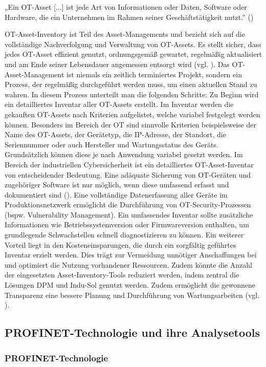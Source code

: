   „Ein OT-Asset [...] ist jede Art von Informationen oder Daten, Software oder Hardware, die ein Unternehmen im Rahmen seiner Geschäftstätigkeit nutzt.'' (\cite{IBM})

OT-Asset-Inventory ist Teil des Asset-Managements und bezieht sich auf die vollständige Nachverfolgung und Verwaltung von OT-Assets. Es stellt sicher, dass jedes OT-Asset effizient genutzt, ordnungsgemäß gewartet, regelmäßig aktualisiert und am Ende seiner Lebensdauer angemessen entsorgt wird (vgl. \cite{IBM}). Das OT-Asset-Management ist niemals ein zeitlich terminiertes Projekt, sondern ein Prozess, der regelmäßig durchgeführt werden muss, um einen aktuellen Stand zu wahren. In diesem Prozess unterteilt man die folgenden Schritte: Zu Beginn wird ein detailliertes Inventar aller OT-Assets erstellt. Im Inventar werden die gekauften OT-Assets nach Kriterien aufgelistet, welche variabel festgelegt werden können. Besonders im Bereich der OT sind sinnvolle Kriterien beispielsweise der Name des OT-Assets, der Gerätetyp, die IP-Adresse, der Standort, die Seriennummer oder auch Hersteller und Wartungsstatus des Geräts. Grundsätzlich können diese je nach Anwendung variabel gesetzt werden. Im Bereich der industriellen Cybersicherheit ist ein detailliertes OT-Asset-Inventar von entscheidender Bedeutung. Eine adäquate Sicherung von OT-Geräten und zugehöriger Software ist nur möglich, wenn diese umfassend erfasst und dokumentiert sind (\cite{atlassian}). Eine vollständige Datenerfassung aller Geräte im Produktionsnetzwerk ermöglicht die Durchführung von OT-Security-Prozessen (bspw. Vulnerability Management). Ein umfassendes Inventar sollte zusätzliche Informationen wie  Betriebssystemversion oder Firmwareversion enthalten, um grundlegende Schwachstellen schnell diagnostizieren zu können. Ein weiterer Vorteil liegt in den Kosteneinsparungen, die durch ein sorgfältig geführtes Inventar erzielt werden. Dies trägt zur Vermeidung unnötiger Anschaffungen bei und optimiert die Nutzung vorhandener Ressourcen. Zudem könnte die Anzahl der eingesetzten Asset-Inventory-Tools reduziert werden, indem zentral die Lösungen DPM und Indu-Sol genutzt werden. Zudem ermöglicht die gewonnene Transparenz eine bessere Planung und Durchführung von Wartungsarbeiten (vgl. \cite{sichereIndustrie}).
\clearpage

\subsection{PROFINET-Technologie und ihre Analysetools}
\subsubsection{PROFINET-Technologie}

